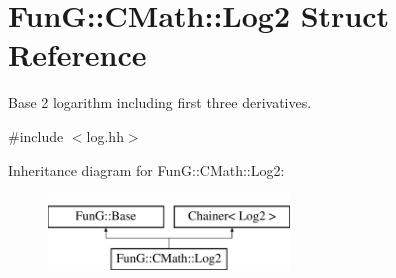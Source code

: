 \hypertarget{structFunG_1_1CMath_1_1Log2}{\section{Fun\-G\-:\-:C\-Math\-:\-:Log2 Struct Reference}
\label{structFunG_1_1CMath_1_1Log2}
}


Base 2 logarithm including first three derivatives.  




{\ttfamily \#include $<$log.\-hh$>$}

Inheritance diagram for Fun\-G\-:\-:C\-Math\-:\-:Log2\-:\begin{figure}[H]
\begin{center}
\leavevmode
\includegraphics[height=2.000000cm]{structFunG_1_1CMath_1_1Log2}
\end{center}
\end{figure}
